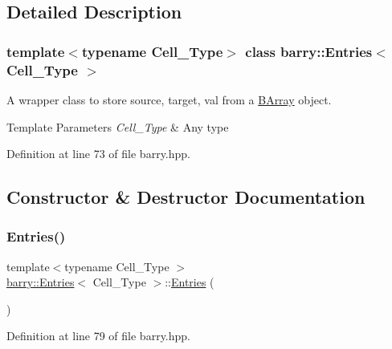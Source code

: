 \subsection{Detailed Description}
\subsubsection*{template$<$typename Cell\+\_\+\+Type$>$\newline
class barry\+::\+Entries$<$ Cell\+\_\+\+Type $>$}

A wrapper class to store {\ttfamily source}, {\ttfamily target}, {\ttfamily val} from a {\ttfamily \hyperlink{classbarry_1_1_b_array}{B\+Array}} object. 


\begin{DoxyTemplParams}{Template Parameters}
{\em Cell\+\_\+\+Type} & Any type \\
\hline
\end{DoxyTemplParams}


Definition at line 73 of file barry.\+hpp.



\subsection{Constructor \& Destructor Documentation}
\mbox{\label{classbarry_1_1_entries_aa51d37ad8e5f441fd64c954dfab9ad04}} 
\subsubsection{\texorpdfstring{Entries()}{Entries()}\hspace{0.1cm}{\footnotesize\ttfamily [1/2]}}
{\footnotesize\ttfamily template$<$typename Cell\+\_\+\+Type $>$ \\
\hyperlink{classbarry_1_1_entries}{barry\+::\+Entries}$<$ Cell\+\_\+\+Type $>$\+::\hyperlink{classbarry_1_1_entries}{Entries} (\begin{DoxyParamCaption}{ }\end{DoxyParamCaption})\hspace{0.3cm}{\ttfamily [inline]}}



Definition at line 79 of file barry.\+hpp.

\mbox{\label{classbarry_1_1_entries_a22dda1d0afd4fbe4b658e55ca1b61f16}} 
